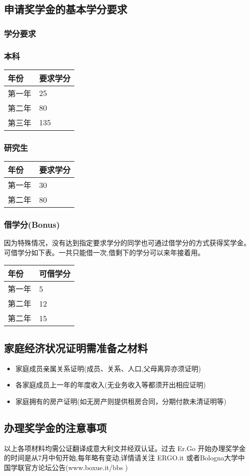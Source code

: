 \subsection{申请奖学金的基本学分要求}

\subsubsection{学分要求}

\subsubsection{本科}
\begin{tabularx}{\textwidth}{ |X|X| }
  \hline
  年份 & 要求学分\\
  \hline 
  第一年  & 25  \\
  第二年  & 80  \\
  第三年  & 135  \\
  \hline
\end{tabularx}



\subsubsection{研究生}
\begin{tabularx}{\textwidth}{ |X|X| }
  \hline
  年份 & 要求学分\\
  \hline 
  第一年  & 30  \\
  第二年  & 80  \\
  \hline
\end{tabularx}


\subsubsection{借学分(Bonus)}
因为特殊情况，没有达到指定要求学分的同学也可通过借学分的方式获得奖学金。可借学分如下表。一共只能借一次,借剩下的学分可以来年接着用。\\
\begin{tabularx}{\textwidth}{ |X|X| }
  \hline
  年份 & 可借学分\\
  \hline 
  第一年  & 5  \\
  第二年  & 12  \\
  第二年  & 15  \\
  \hline
\end{tabularx}

\subsection{家庭经济状况证明需准备之材料}
\begin{itemize}
 \item 家庭成员亲属关系证明(成员、关系、人口,父母离异亦须证明)
 \item 各家庭成员上一年的年度收入(无业务收入等都须开出相应证明) 
 \item 家庭拥有的房产证明(如无房产则提供租房合同，分期付款未清证明等)
\end{itemize} 

\subsection{办理奖学金的注意事项}
以上各项材料均需公证翻译成意大利文并经双认证。过去 Er.Go 开始办理奖学金的时间是从7月中旬开始,每年略有变动,详情请关注 ERGO.it 或者Bologna大学中国学联官方论坛公告(www.boxue.it/bbs ) 